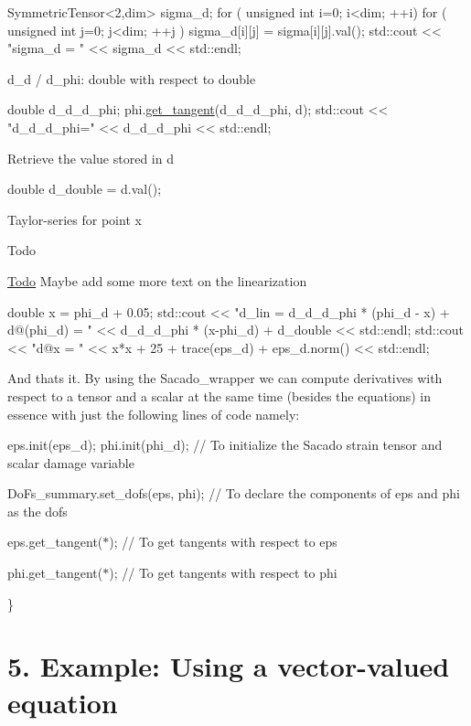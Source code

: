 \begin{DoxyCode}
SymmetricTensor<2,dim> sigma\_d;
\textcolor{keywordflow}{for} ( \textcolor{keywordtype}{unsigned} \textcolor{keywordtype}{int} i=0; i<dim; ++i)
      \textcolor{keywordflow}{for} ( \textcolor{keywordtype}{unsigned} \textcolor{keywordtype}{int} j=0; j<dim; ++j )
          sigma\_d[i][j] = sigma[i][j].val();
std::cout << \textcolor{stringliteral}{"sigma\_d = "} << sigma\_d << std::endl;
\end{DoxyCode}
 d\+\_\+d / d\+\_\+phi\+: double with respect to double 
\begin{DoxyCode}
\textcolor{keywordtype}{double} d\_d\_d\_phi;
phi.\hyperlink{classSacado__Wrapper_1_1SW__double_a2e6eca4457eb22b06172bb5749038f1e}{get\_tangent}(d\_d\_d\_phi, d);
std::cout << \textcolor{stringliteral}{"d\_d\_d\_phi="} << d\_d\_d\_phi << std::endl;
\end{DoxyCode}
 Retrieve the value stored in d 
\begin{DoxyCode}
\textcolor{keywordtype}{double} d\_double = d.val();
\end{DoxyCode}
 Taylor-\/series for point x \begin{DoxyRefDesc}{Todo}
\item[\hyperlink{todo__todo000007}{Todo}]Maybe add some more text on the linearization \end{DoxyRefDesc}

\begin{DoxyCode}
\textcolor{keywordtype}{double} x = phi\_d + 0.05;
std::cout << \textcolor{stringliteral}{"d\_lin = d\_d\_d\_phi * (phi\_d - x) + d@(phi\_d) = "} << d\_d\_d\_phi * (x-phi\_d) + d\_double << 
      std::endl;
std::cout << \textcolor{stringliteral}{"d@x = "} << x*x + 25 + trace(eps\_d) + eps\_d.norm() << std::endl;
\end{DoxyCode}
 And that\textquotesingle{}s it. By using the Sacado\+\_\+wrapper we can compute derivatives with respect to a tensor and a scalar at the same time (besides the equations) in essence with just the following lines of code namely\+:
\begin{DoxyItemize}
\item eps.\+init(eps\+\_\+d); phi.\+init(phi\+\_\+d); // To initialize the Sacado strain tensor and scalar damage variable
\item Do\+Fs\+\_\+summary.\+set\+\_\+dofs(eps, phi); // To declare the components of eps and phi as the dofs
\item eps.\+get\+\_\+tangent($\ast$); // To get tangents with respect to eps
\item phi.\+get\+\_\+tangent($\ast$); // To get tangents with respect to phi 
\begin{DoxyCode}
\}
\end{DoxyCode}
 
\end{DoxyItemize}\hypertarget{index_Ex5}{}\section{5. Example\+: Using a vector-\/valued equation}\label{index_Ex5}


